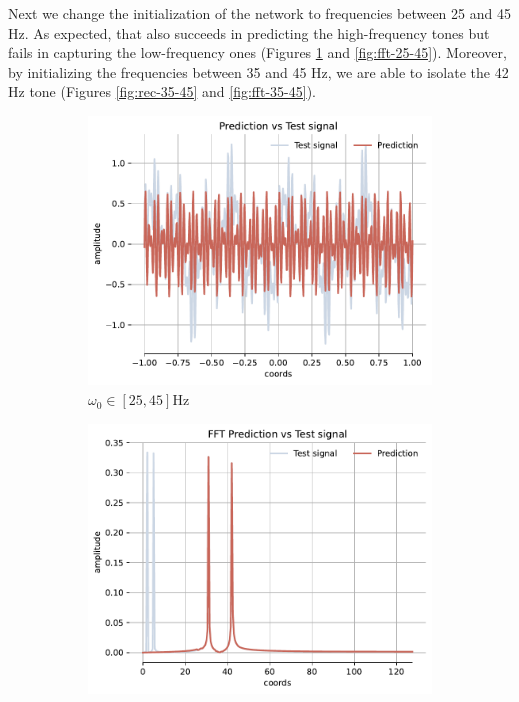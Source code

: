 Next we change the initialization of the network to frequencies between 25 and 45 Hz. As expected, that also succeeds in predicting the high-frequency tones but fails in capturing the low-frequency ones (Figures \ref{fig:rec-25-45} and \ref{fig:fft-25-45}). Moreover, by initializing the frequencies between 35 and 45 Hz, we are able to isolate the 42 Hz tone (Figures \ref{fig:rec-35-45} and \ref{fig:fft-35-45}).

\begin{figure}[h!]
    \centering
    \begin{subfigure}[b]{0.38\textwidth}
        \centering
        \includegraphics[width=\textwidth]{img/ch4/prediction_w25-45_2pi.pdf}
        \caption{$\omega_0 \in [25, 45]$Hz}
        \label{fig:rec-25-45}
    \end{subfigure}
    \begin{subfigure}[b]{0.38\textwidth}
        \centering
        \includegraphics[width=\textwidth]{img/ch4/fft_w25-45.pdf}

\end{subfigure}
\end{figure}
